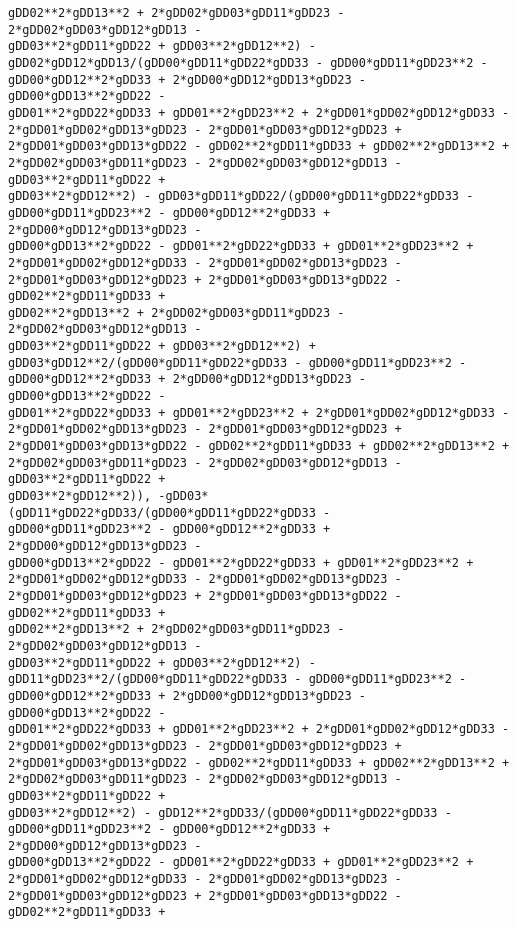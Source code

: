 \documentclass[landscape,letterpaper,10pt,english]{article}
\begin{document}
\begin{Verbatim}[commandchars=\\\{\}]
gDD02**2*gDD13**2 + 2*gDD02*gDD03*gDD11*gDD23 - 2*gDD02*gDD03*gDD12*gDD13 -
gDD03**2*gDD11*gDD22 + gDD03**2*gDD12**2) -
gDD02*gDD12*gDD13/(gDD00*gDD11*gDD22*gDD33 - gDD00*gDD11*gDD23**2 -
gDD00*gDD12**2*gDD33 + 2*gDD00*gDD12*gDD13*gDD23 - gDD00*gDD13**2*gDD22 -
gDD01**2*gDD22*gDD33 + gDD01**2*gDD23**2 + 2*gDD01*gDD02*gDD12*gDD33 -
2*gDD01*gDD02*gDD13*gDD23 - 2*gDD01*gDD03*gDD12*gDD23 +
2*gDD01*gDD03*gDD13*gDD22 - gDD02**2*gDD11*gDD33 + gDD02**2*gDD13**2 +
2*gDD02*gDD03*gDD11*gDD23 - 2*gDD02*gDD03*gDD12*gDD13 - gDD03**2*gDD11*gDD22 +
gDD03**2*gDD12**2) - gDD03*gDD11*gDD22/(gDD00*gDD11*gDD22*gDD33 -
gDD00*gDD11*gDD23**2 - gDD00*gDD12**2*gDD33 + 2*gDD00*gDD12*gDD13*gDD23 -
gDD00*gDD13**2*gDD22 - gDD01**2*gDD22*gDD33 + gDD01**2*gDD23**2 +
2*gDD01*gDD02*gDD12*gDD33 - 2*gDD01*gDD02*gDD13*gDD23 -
2*gDD01*gDD03*gDD12*gDD23 + 2*gDD01*gDD03*gDD13*gDD22 - gDD02**2*gDD11*gDD33 +
gDD02**2*gDD13**2 + 2*gDD02*gDD03*gDD11*gDD23 - 2*gDD02*gDD03*gDD12*gDD13 -
gDD03**2*gDD11*gDD22 + gDD03**2*gDD12**2) +
gDD03*gDD12**2/(gDD00*gDD11*gDD22*gDD33 - gDD00*gDD11*gDD23**2 -
gDD00*gDD12**2*gDD33 + 2*gDD00*gDD12*gDD13*gDD23 - gDD00*gDD13**2*gDD22 -
gDD01**2*gDD22*gDD33 + gDD01**2*gDD23**2 + 2*gDD01*gDD02*gDD12*gDD33 -
2*gDD01*gDD02*gDD13*gDD23 - 2*gDD01*gDD03*gDD12*gDD23 +
2*gDD01*gDD03*gDD13*gDD22 - gDD02**2*gDD11*gDD33 + gDD02**2*gDD13**2 +
2*gDD02*gDD03*gDD11*gDD23 - 2*gDD02*gDD03*gDD12*gDD13 - gDD03**2*gDD11*gDD22 +
gDD03**2*gDD12**2)), -gDD03*(gDD11*gDD22*gDD33/(gDD00*gDD11*gDD22*gDD33 -
gDD00*gDD11*gDD23**2 - gDD00*gDD12**2*gDD33 + 2*gDD00*gDD12*gDD13*gDD23 -
gDD00*gDD13**2*gDD22 - gDD01**2*gDD22*gDD33 + gDD01**2*gDD23**2 +
2*gDD01*gDD02*gDD12*gDD33 - 2*gDD01*gDD02*gDD13*gDD23 -
2*gDD01*gDD03*gDD12*gDD23 + 2*gDD01*gDD03*gDD13*gDD22 - gDD02**2*gDD11*gDD33 +
gDD02**2*gDD13**2 + 2*gDD02*gDD03*gDD11*gDD23 - 2*gDD02*gDD03*gDD12*gDD13 -
gDD03**2*gDD11*gDD22 + gDD03**2*gDD12**2) -
gDD11*gDD23**2/(gDD00*gDD11*gDD22*gDD33 - gDD00*gDD11*gDD23**2 -
gDD00*gDD12**2*gDD33 + 2*gDD00*gDD12*gDD13*gDD23 - gDD00*gDD13**2*gDD22 -
gDD01**2*gDD22*gDD33 + gDD01**2*gDD23**2 + 2*gDD01*gDD02*gDD12*gDD33 -
2*gDD01*gDD02*gDD13*gDD23 - 2*gDD01*gDD03*gDD12*gDD23 +
2*gDD01*gDD03*gDD13*gDD22 - gDD02**2*gDD11*gDD33 + gDD02**2*gDD13**2 +
2*gDD02*gDD03*gDD11*gDD23 - 2*gDD02*gDD03*gDD12*gDD13 - gDD03**2*gDD11*gDD22 +
gDD03**2*gDD12**2) - gDD12**2*gDD33/(gDD00*gDD11*gDD22*gDD33 -
gDD00*gDD11*gDD23**2 - gDD00*gDD12**2*gDD33 + 2*gDD00*gDD12*gDD13*gDD23 -
gDD00*gDD13**2*gDD22 - gDD01**2*gDD22*gDD33 + gDD01**2*gDD23**2 +
2*gDD01*gDD02*gDD12*gDD33 - 2*gDD01*gDD02*gDD13*gDD23 -
2*gDD01*gDD03*gDD12*gDD23 + 2*gDD01*gDD03*gDD13*gDD22 - gDD02**2*gDD11*gDD33 +

\end{Verbatim}
\end{document}
